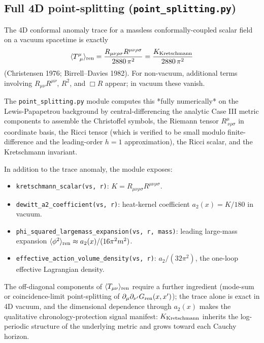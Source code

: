 \documentclass[11pt,a4paper]{article}
\begin{document}
\subsection{Full 4D point-splitting (\texttt{point\_splitting.py})}
\label{sec:4d-point-splitting}

The 4D conformal anomaly trace for a massless conformally-coupled
scalar field on a vacuum spacetime is exactly
\begin{equation}
\langle T^\mu_{~\mu} \rangle_{\rm ren}
= \frac{R_{\mu\nu\rho\sigma} R^{\mu\nu\rho\sigma}}{2880\,\pi^2}
= \frac{K_{\rm Kretschmann}}{2880\,\pi^2}
\end{equation}
(Christensen 1976; Birrell--Davies 1982). For non-vacuum, additional
terms involving $R_{\mu\nu} R^{\mu\nu}$, $R^2$, and $\Box R$ appear;
in vacuum these vanish.

The \texttt{point\_splitting.py} module computes this *fully numerically*
on the Lewis-Papapetrou background by central-differencing the
analytic Case III metric components to assemble the Christoffel
symbols, the Riemann tensor $R^\mu_{~\nu\rho\sigma}$ in coordinate
basis, the Ricci tensor (which is verified to be small modulo finite-
difference and the leading-order $h = 1$ approximation), the Ricci
scalar, and the Kretschmann invariant.

In addition to the trace anomaly, the module exposes:
\begin{itemize}[leftmargin=*]
\item \texttt{kretschmann\_scalar(vs, r)}: $K = R_{\mu\nu\rho\sigma}
R^{\mu\nu\rho\sigma}$.
\item \texttt{dewitt\_a2\_coefficient(vs, r)}: heat-kernel coefficient
$a_2(x) = K / 180$ in vacuum.
\item \texttt{phi\_squared\_largemass\_expansion(vs, r, mass)}: leading
large-mass expansion $\langle \phi^2 \rangle_{\rm ren} \approx
a_2(x) / (16\pi^2 m^2)$.
\item \texttt{effective\_action\_volume\_density(vs, r)}: $a_2 /
(32\pi^2)$, the one-loop effective Lagrangian density.
\end{itemize}

The off-diagonal components of $\langle T_{\mu\nu} \rangle_{\rm ren}$
require a further ingredient (mode-sum or coincidence-limit
point-splitting of $\partial_\mu \partial_{\nu'} G_{\rm ren}(x, x')$);
the trace alone is exact in 4D vacuum, and the dimensional dependence
through $a_2(x)$ makes the qualitative chronology-protection signal
manifest: $K_{\rm Kretschmann}$ inherits the log-periodic structure
of the underlying metric and grows toward each Cauchy horizon.
\end{document}
